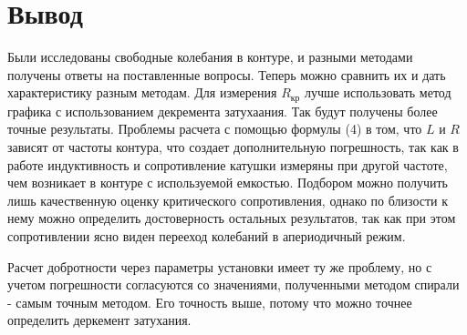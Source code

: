 \documentclass[a4paper, 14pt]{extarticle}%
\begin{document}
\section*{Вывод}

Были исследованы свободные колебания в контуре, и разными методами получены ответы на поставленные вопросы. Теперь можно сравнить их и дать характеристику разным методам. Для измерения $R_{\text{кр}}$ лучше использовать метод графика с использованием декремента затухаания. Так будут получены более точные результаты. Проблемы расчета с помощью формулы (4) в том, что $L$ и $R$ зависят от частоты контура, что создает дополнительную погрешность, так как в работе индуктивность и сопротивление катушки измеряны при другой частоте, чем возникает в контуре с используемой емкостью. Подбором можно получить лишь качественную оценку критического сопротивления, однако по близости к нему можно определить достоверность остальных результатов, так как при этом сопротивлении ясно виден перееход колебаний в апериодичный режим. 

Расчет добротности через параметры установки имеет ту же проблему, но с учетом погрешности согласуются со значениями, полученными методом спирали - самым точным методом. Его точность выше, потому что можно точнее определить деркемент затухания.
\end{document}
